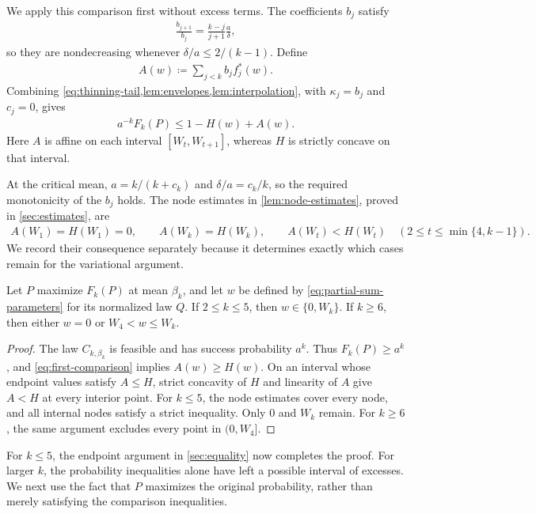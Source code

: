 We apply this comparison first without excess terms. The coefficients $b_j$ satisfy
\begin{align*}
 \frac{b_{j+1}}{b_j}=\frac{k-j}{j+1}\frac a\delta,
\end{align*}
so they are nondecreasing whenever $\delta/a\le2/(k-1)$. Define
\begin{align}\label{eq:A-definition}
 A(w)\coloneqq\sum_{j<k}b_jf_j^*(w).
\end{align}
Combining \cref{eq:thinning-tail,lem:envelopes,lem:interpolation}, with $\kappa_j=b_j$ and $c_j=0$, gives
\begin{align}\label{eq:first-comparison}
 a^{-k}F_k(P)\le1-H(w)+A(w).
\end{align}
Here $A$ is affine on each interval $[W_t,W_{t+1}]$, whereas $H$ is strictly concave on that interval.

At the critical mean, $a=k/(k+c_k)$ and $\delta/a=c_k/k$, so the required monotonicity of the $b_j$ holds. The node estimates in \cref{lem:node-estimates}, proved in \cref{sec:estimates}, are
\begin{align*}
 A(W_1)=H(W_1)=0,
 \qquad A(W_k)=H(W_k),
 \qquad A(W_t)<H(W_t)\quad(2\le t\le\min\{4,k-1\}).
\end{align*}
We record their consequence separately because it determines exactly which cases remain for the variational argument.

\begin{lemma}\label{lem:initial-comparison}
Let $P$ maximize $F_k(P)$ at mean $\beta_k$, and let $w$ be defined by \cref{eq:partial-sum-parameters} for its normalized law $Q$. If $2\le k\le5$, then $w\in\{0,W_k\}$. If $k\ge6$, then either $w=0$ or $W_4<w\le W_k$.
\end{lemma}

\begin{proof}
The law $C_{k,\beta_k}$ is feasible and has success probability $a^k$. Thus $F_k(P)\ge a^k$, and \cref{eq:first-comparison} implies $A(w)\ge H(w)$. On an interval whose endpoint values satisfy $A\le H$, strict concavity of $H$ and linearity of $A$ give $A<H$ at every interior point. For $k\le5$, the node estimates cover every node, and all internal nodes satisfy a strict inequality. Only $0$ and $W_k$ remain. For $k\ge6$, the same argument excludes every point in $(0,W_4]$.
\end{proof}

For $k\le5$, the endpoint argument in \cref{sec:equality} now completes the proof. For larger $k$, the probability inequalities alone have left a possible interval of excesses. We next use the fact that $P$ maximizes the original probability, rather than merely satisfying the comparison inequalities.
